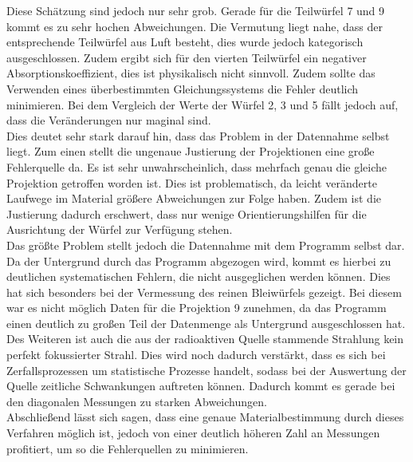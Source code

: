 Diese Schätzung sind jedoch nur sehr grob. Gerade für die Teilwürfel 7 und 9 kommt es zu sehr hochen Abweichungen. Die Vermutung liegt nahe, dass der entsprechende Teilwürfel aus Luft besteht, dies wurde jedoch kategorisch ausgeschlossen. Zudem ergibt sich für den vierten Teilwürfel ein negativer Absorptionskoeffizient, dies ist physikalisch nicht sinnvoll. Zudem sollte das Verwenden eines überbestimmten Gleichungssystems die Fehler deutlich minimieren. Bei dem Vergleich der Werte der Würfel 2, 3 und 5 fällt jedoch auf, dass die Veränderungen nur maginal sind. \\
Dies deutet sehr stark darauf hin, dass das Problem in der Datennahme selbst liegt. Zum einen stellt die ungenaue Justierung der Projektionen eine große Fehlerquelle da. Es ist sehr unwahrscheinlich, dass mehrfach genau die gleiche Projektion getroffen worden ist. Dies ist problematisch, da leicht veränderte Laufwege im Material größere Abweichungen zur Folge haben. Zudem ist die Justierung dadurch erschwert, dass nur wenige Orientierungshilfen für die Ausrichtung der Würfel zur Verfügung stehen. \\
Das größte Problem stellt jedoch die Datennahme mit dem Programm selbst dar. Da der Untergrund durch das Programm abgezogen wird, kommt es hierbei zu deutlichen systematischen Fehlern, die nicht ausgeglichen werden können. Dies hat sich besonders bei der Vermessung des reinen Bleiwürfels gezeigt. Bei diesem war es nicht möglich Daten für die Projektion 9 zunehmen, da das Programm einen deutlich zu großen Teil der Datenmenge als Untergrund ausgeschlossen hat.\\
Des Weiteren ist auch die aus der radioaktiven Quelle stammende Strahlung kein
perfekt fokussierter Strahl. Dies wird noch dadurch verstärkt, dass es sich bei Zerfallsprozessen um statistische Prozesse handelt, sodass bei der Auswertung der Quelle zeitliche Schwankungen auftreten können. Dadurch kommt es gerade bei den diagonalen Messungen zu starken Abweichungen.\\
Abschließend lässt sich sagen, dass eine genaue Materialbestimmung durch dieses Verfahren möglich ist, jedoch von einer deutlich höheren Zahl an Messungen profitiert, um so die Fehlerquellen zu minimieren.
